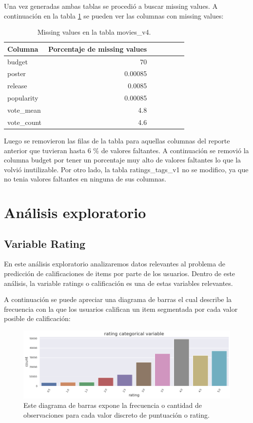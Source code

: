 \documentclass[11pt,a4paper,twoside]{thesis}
\begin{document}
Una vez generadas ambas tablas se procedió a buscar missing values. A continuación en la tabla \ref{table:tab} 
se pueden ver las columnas con missing values:
\begin{table}[h!]
\centering
\footnotesize
\begin{tabular}{lrrrrrr}
\hline
Columna &  Porcentaje de missing values \\
\hline
   	budget     &  70      \\
   	poster     &  0.00085 \\
   	release    &  0.0085  \\
	popularity &  0.00085 \\
	vote\_mean  &  4.8     \\
	vote\_count &  4.6     \\
\hline
\end{tabular}
\caption{Missing values en la tabla movies\_v4.}
\label{table:tab}
\end{table}

Luego se removieron las filas de la tabla para aquellas columnas del reporte anterior que tuvieran hasta 6 \% de valores faltantes. A continuación se removió la columna budget por tener un porcentaje muy alto de valores faltantes lo que la volvió inutilizable. Por otro lado, la tabla ratings\_tags\_v1 no se modifico, ya que no tenia valores faltantes en ninguna de sus columnas.


\clearpage
\section{Análisis exploratorio}


\subsection{Variable Rating}


En este análisis exploratorio analizaremos datos relevantes al problema de predicción de calificaciones de items por parte de los usuarios. Dentro de este análisis, la variable ratings o calificación es una de estas variables relevantes.

A continuación se puede apreciar una diagrama de barras el cual describe la frecuencia con la que los usuarios califican un item segmentada por cada valor posible de calificación:


\begin{figure}[h!]
	\centering
	\includegraphics[width=15cm]{./images/rating-barplot.png}
	\caption{Este diagrama de barras expone la frecuencia o cantidad de observaciones para cada valor discreto de puntuación o rating.}
	\label{fig:ratingsBarPlot}
\end{figure}
\end{document}
